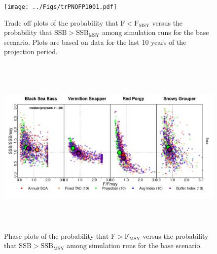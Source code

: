 \documentclass[12pt,english]{article}
\begin{document}
\clearpage\begin{figure}[!ht]
\begin{center}
\texttt{[image: ../Figs/trPNOFP1001.pdf]}
\end{center}
\begin{flushleft}
\caption{Trade off plots of the probability that $\mathrm{F < F_{MSY}}$  versus  the probability that $\mathrm{SSB > SSB_{MSY}}$ among simulation runs for the base scenario. Plots are based on data for the last 10 years of the projection period.}
\label{fig:trPNOFP1001}
\end{flushleft}
\end{figure}
\clearpage
\begin{figure}[!ht]
\begin{center}
\includegraphics[width=7in, height=3.5in]{../Figs/phasePlot1.pdf}
\end{center}
\begin{flushleft}
\caption{Phase plots of the probability that $\mathrm{F > F_{MSY}}$  versus  the probability that $\mathrm{SSB > SSB_{MSY}}$ among simulation runs for the base scenario.}
\label{fig:phasePlot1}
\end{flushleft}
\end{figure}
\clearpage
\end{document}
